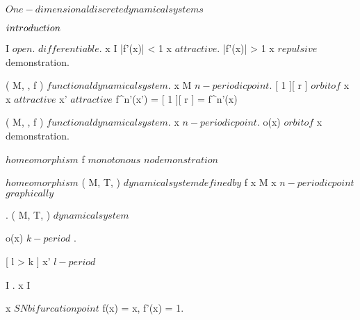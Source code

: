 \documentclass[../Main/main]{subfiles}
\begin{document}
\unit{ $ One-dimensional discrete dynamical systems $ }
{
	\introduction
	{ 
		$introduction\\$ 
	}

	{
		{
			I \subset \R $ open $.
			 $ differentiable $.
			x \in I
		}
		\holds
		{
			|f'(x)| < 1 \imp x $ attractive $.
			|f'(x)| > 1 \imp x $ repulsive $
		}
		\demonstration
		{
			demonstration.
		}
	}
	
	
	{
		{
			( M, \N, f ) $ functional dynamical system $.
			x \in M $ n-periodic point $.
			[ 1 ][ r ] $ orbit of $ x
		}
		\holds
		{
			x $ attractive $ \ifandonlyif {}
			{
				x' $ attractive $
			}
		}
		\demonstration
		{
			{
				f^{n'}(x') = [ 1 ][ r ] = f^{n'}(x)
			}
		}
	}


	{
		{
			( M, \N, f ) $ functional dynamical system $.
			x $ n-periodic point $.
			o(x) $ orbit of $ x
		}
		\holds
		{
			{
			}
		}
		\demonstration
		{
			demonstration.
		}
	}
	
	
	{
		{
			 $ homeomorphism $
		}
		\holds
		{
			f $ monotonous $
		}
		\demonstration
		{
			$ no demonstration $
		}
	}


	{
		{
			 $ homeomorphism $
			( M, T, \phi ) $ dynamical system defined by $ f
		}
		\holds
		{
			{
				\nexists \; x \in M \suchthat x $ n-periodic point $
			}
		}
		\demonstration
		{
			$graphically $
		}
	}


	{
		{
			.
			( M, T, \phi ) $ dynamical system $
		}
		\holds
		{
			{
				o(x) $ k-period $
			}.

			\imp {}
			{
				{
					x' $ l-period $
				}
			}
		}
	}


	{
		{
			I \subset \R
			.
			x \in I
		}
		\holds
		{
			x $ SN bifurcation point $ \ifandonlyif f(x) = x, f'(x) = 1.

}}}
\end{document}
